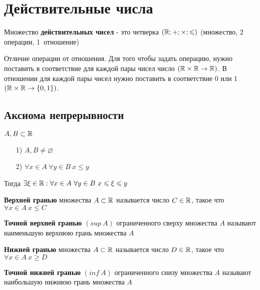 \section{Действительные числа}

\begin{definition}
    Множество \textbf{действительных чисел} - это четверка $(\mathbb{R}; +; \times; \leqslant)$ (множество, 2 операции, 1~отношение)
\end{definition}

\begin{remark}
    Отличие операции от отношения. Для того чтобы задать операцию, нужно поставить в соответствие для каждой пары чисел число $(\mathbb{R} \times \mathbb{R} \to \mathbb{R})$. В отношении для каждой пары чисел нужно поставить в соответствие 0 или 1 $(\mathbb{R} \times \mathbb{R} \to \{0, 1\})$.
\end{remark}

\subsection{Аксиома непрерывности}
$ A, B \subset \mathbb{R} $
\begin{itemize}
    \item[1)] $ A, B \neq \varnothing $
    \item[2)] $ \forall x \in A\ \forall y \in B\ x \leq y$
\end{itemize}
Тогда $ \exists \xi \in \mathbb{R} : \forall x \in A\ \forall y \in B\ x \leqslant \xi \leqslant y $

\begin{definition}
    \textbf{Верхней гранью} множества $A \subset \mathbb{R}$ называется число $C \in \mathbb{R}$, такое что $\forall x \in A\ x \leq C$
\end{definition}

\begin{definition}
    \textbf{Точной верхней гранью} $(sup\ A)$ ограниченного сверху множества $A$ называют наименьшую верхнюю грань множества $A$
\end{definition}

\begin{definition}
    \textbf{Нижней гранью} множества $A \subset \mathbb{R}$ называется число $D \in \mathbb{R}$, такое что $\forall x \in A\ x \geq D$
\end{definition}

\begin{definition}
    \textbf{Точной нижней гранью} $(inf\ A)$ ограниченного снизу множества $A$ называют наибольшую нижнюю грань множества $A$
\end{definition}

